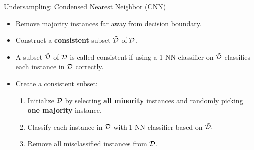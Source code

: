 \documentclass[11pt,compress,t,notes=noshow, xcolor=table]{beamer}
\begin{document}
            


	
	
\begin{frame}{Undersampling: Condensed Nearest Neighbor (CNN)}
	
    \begin{itemize}
    
        \item Remove majority instances far away from decision boundary. 
        \item Construct a \textbf{consistent} subset $\tilde{\mathcal{D}}$ of $\mathcal{D}$. %

        \item A subset $\tilde{\mathcal{D}}$ of $\mathcal{D}$ is called consistent if using a 1-NN classifier on $\tilde{\mathcal{D}}$ classifies each instance in $\mathcal{D}$ correctly.



        \item Create a consistent subset:
        
        \begin{enumerate}
    
            \item Initialize $\tilde{\mathcal{D}}$ by selecting \textbf{all minority} instances and randomly picking \textbf{one majority} instance.
    
            \item Classify each instance in $\mathcal{D}$ with 1-NN classifier based on $\tilde{\mathcal{D}}.$
        
            \item Remove all misclassified instances from $\mathcal{D}$.
            
        \end{enumerate}	
    
    \end{itemize}
    
    
\end{frame}
	
\end{document}
